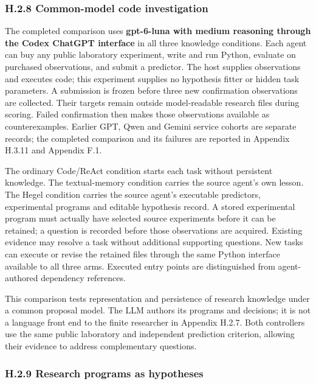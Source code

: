 \documentclass[twoside,11pt]{article}
\begin{document}
\subsubsection*{H.2.8 Common-model code investigation}

The completed comparison uses \textbf{gpt-6-luna with medium reasoning through the
Codex ChatGPT interface} in all three knowledge conditions. Each agent can buy
any public laboratory experiment, write and run Python, evaluate on purchased
observations, and submit a predictor. The host supplies observations and executes
code; this experiment supplies no hypothesis fitter or hidden task parameters.
A submission is frozen before three new confirmation observations are collected.
Their targets remain outside model-readable research files during scoring.
Failed confirmation then makes those observations available as counterexamples.
Earlier GPT, Qwen and Gemini service cohorts are separate records; the completed
comparison and its failures are reported in Appendix H.3.11 and Appendix F.1.


The ordinary Code/ReAct condition starts each task without persistent knowledge.
The textual-memory condition carries the source agent's own lesson. The Hegel
condition carries the source agent's executable predictors, experimental
programs and editable hypothesis record. A stored experimental program must
actually have selected source experiments before it can be retained; a question
is recorded before those observations are acquired. Existing evidence may resolve
a task without additional supporting questions. New tasks can execute or revise
the retained files through the same Python interface available to all three arms.
Executed entry points are distinguished from agent-authored dependency references.


This comparison tests representation and persistence of research knowledge under
a common proposal model. The LLM authors its programs and decisions; it is not
a language front end to the finite researcher in Appendix H.2.7. Both controllers
use the same public laboratory and independent prediction criterion, allowing
their evidence to address complementary questions.


\subsubsection*{H.2.9 Research programs as hypotheses}
\end{document}
